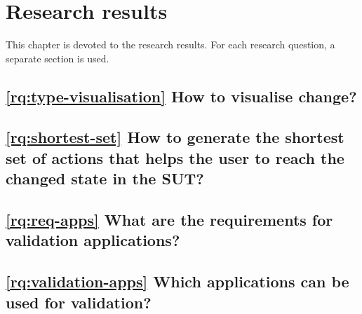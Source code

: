 \chapter{Research results}

This chapter is devoted to the research results. For each research question, a separate section is used. 








\section{\ref{rq:type-visualisation} How to visualise change?} \label{rq:type-visualisation-answer}


\section{\ref{rq:shortest-set} How to generate the shortest set of actions that helps the user to reach the changed state in the SUT?}

\section{\ref{rq:req-apps} What are the requirements for validation applications?}

\section{\ref{rq:validation-apps} Which applications can be used for validation?}
